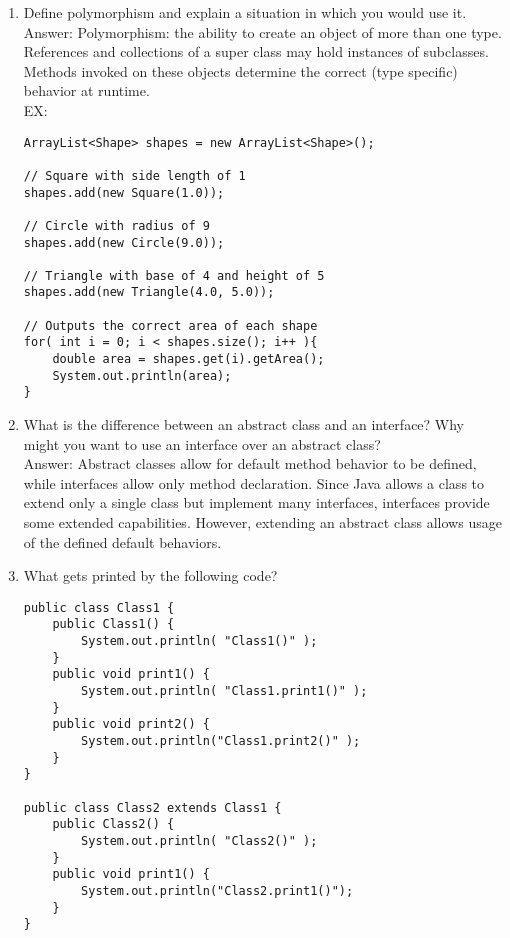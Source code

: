\documentclass[11pt]{article}
\newenvironment{answer}{\large\lstset{basicstyle=\large\ttfamily}\color{white} \small{Answer:}\large}{}
\newenvironment{answer}{\large\lstset{basicstyle=\large\ttfamily}\color{red} \small{Answer:}\large}{}
\begin{document}
\begin{enumerate}
\item Define polymorphism and explain a situation in which you would use it. \\
\begin{answer}
Polymorphism: the ability to create an object of more than one type. References and collections of a super class may hold instances of subclasses. Methods invoked on these objects determine the correct (type specific) behavior at runtime. \\
EX:
		\begin{lstlisting}
ArrayList<Shape> shapes = new ArrayList<Shape>();

// Square with side length of 1
shapes.add(new Square(1.0));

// Circle with radius of 9
shapes.add(new Circle(9.0));

// Triangle with base of 4 and height of 5
shapes.add(new Triangle(4.0, 5.0));

// Outputs the correct area of each shape
for( int i = 0; i < shapes.size(); i++ ){ 
   	double area = shapes.get(i).getArea();
   	System.out.println(area);
}
        \end{lstlisting}
\end{answer}



\item What is the difference between an abstract class and an interface? Why might you want to use an interface over an abstract class? \\
\begin{answer}
Abstract classes allow for default method behavior to be defined, while interfaces allow only method declaration.  Since Java allows a class to extend only a single class but implement many interfaces, interfaces provide some extended capabilities. However, extending an abstract class allows usage of the defined default behaviors. 
\end{answer}


\newpage


\item What gets printed by the following code?
\begin{lstlisting}
public class Class1 {
	public Class1() {
		System.out.println( "Class1()" );
	}
	public void print1() {
		System.out.println( "Class1.print1()" );
	}
	public void print2() {
		System.out.println("Class1.print2()" );
	}
}

public class Class2 extends Class1 {
	public Class2() {
		System.out.println( "Class2()" );
	}
	public void print1() {
		System.out.println("Class2.print1()");
	}
}


\end{lstlisting}
\end{enumerate}
\end{document}
